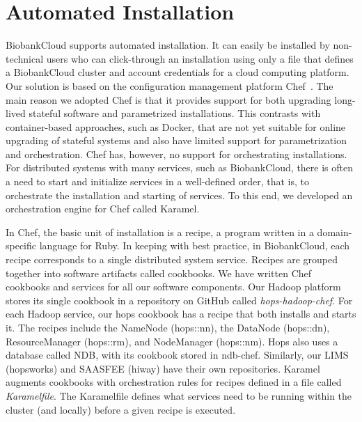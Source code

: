 \section{Automated Installation}

BiobankCloud supports automated installation. It can easily be installed by non-technical users who can click-through an installation using only a file that defines a BiobankCloud cluster and account credentials for a cloud computing platform. Our solution is based on the configuration management platform Chef~\cite{chef13nelson}. The main reason we adopted Chef is that it provides support for both upgrading long-lived stateful software and parametrized installations. This contrasts with container-based approaches, such as Docker, that are not yet suitable for online upgrading of stateful systems and also have limited support for parametrization and orchestration. Chef has, however, no support for orchestrating installations. For distributed systems with many services, such as BiobankCloud, there is often a need to start and initialize services in a well-defined order, that is, to orchestrate the installation and starting of services. To this end, we developed an orchestration engine for Chef called Karamel. 

In Chef, the basic unit of installation is a recipe, a program written in a domain-specific language for Ruby. In keeping with best practice, in BiobankCloud, each recipe corresponds to a single distributed system service. Recipes are grouped together into software artifacts called cookbooks. We have written Chef cookbooks and services for all our software components. Our Hadoop platform stores its single cookbook in a repository on GitHub called \textit{hops-hadoop-chef}. For each Hadoop service, our hops cookbook has a recipe that both installs and starts it. The recipes include the NameNode (hops::nn), the DataNode (hops::dn), ResourceManager (hops::rm), and NodeManager (hops::nm). Hops also uses a database called NDB, with its cookbook stored in ndb-chef. Similarly, our LIMS (hopsworks) and SAASFEE (hiway) have their own repositories. Karamel augments cookbooks with orchestration rules for recipes defined in a file called \textit{Karamelfile}. The Karamelfile defines what services need to be running within the cluster (and locally) before a given recipe is executed. 

